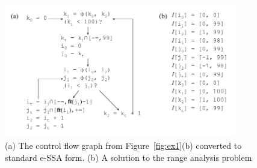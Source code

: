 \documentclass{llncs}
\begin{document}

\begin{figure}[t!]
\begin{center}
\includegraphics[width=0.9\textwidth]{images/ex_standard_eSSA}
\end{center}
\caption{\label{fig:ex_standard_eSSA}
(a) The control flow graph from Figure~\ref{fig:ex1}(b) converted to standard
e-SSA form.
(b) A solution to the range analysis problem
}
\end{figure}


\end{document}
